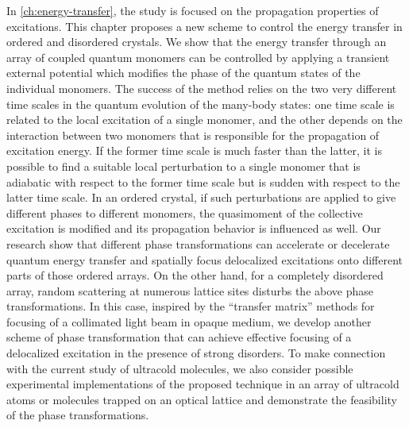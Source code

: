 In \autoref{ch:energy-transfer}, 
the study is focused on the propagation properties of excitations. This chapter proposes a new scheme to control the 
energy transfer in ordered and disordered crystals. 
We 
show that the energy transfer through an array of coupled quantum monomers can be controlled by applying a 
transient external potential which modifies the phase of the quantum states of the individual monomers. The success of the method relies 
on the two very different time scales in the quantum evolution of the many-body states: one time scale is related to the 
local excitation of a single monomer, and the other depends on the interaction between two monomers that is responsible
for the propagation of excitation energy. If the former time scale is much faster than the latter, it is possible to find a suitable
local perturbation to a single monomer that is adiabatic with respect to the former time scale but is sudden
with respect to the latter time scale.  In an ordered crystal, if such perturbations are applied to give different phases to 
different monomers, the quasimoment of the collective excitation is modified and its propagation behavior is influenced
as well. Our research show that different phase transformations can accelerate or decelerate quantum energy transfer and 
spatially focus delocalized excitations onto different parts of those ordered arrays. On the other hand, for a completely disordered array,  random scattering at numerous lattice sites disturbs the above phase transformations. In this case,  inspired by the ``transfer matrix'' methods for focusing of a 
collimated light beam in opaque medium\cite{opaque-1, Gigan-TMeasure-PRL10, Mosk-NPhot10, Cizmar-NPhot10, 
Silberberg-11, Chatel-Focusing-11, Lagendijk-Focusing-11, zhenia-11, cui-11, kim-11},
we develop another scheme of phase transformation that 
can achieve effective focusing of a delocalized excitation in the presence of strong disorders. To make connection with the current study of  
ultracold molecules,  we also consider possible experimental implementations of the proposed technique in an array of 
ultracold atoms or molecules trapped on an optical lattice and demonstrate the feasibility of the phase transformations. 

